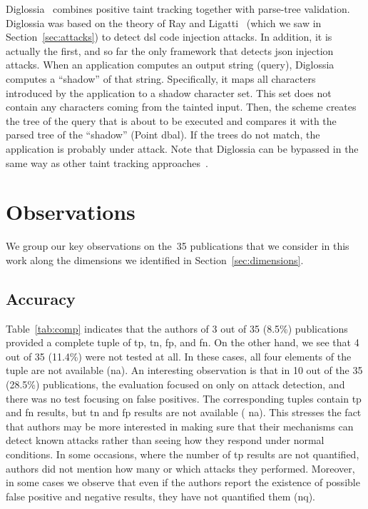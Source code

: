\documentclass[10pt,journal,compsoc]{IEEEtran}
\begin{document}
Diglossia~\cite{SMS13} combines positive taint tracking together
with parse-tree validation. Diglossia was based on the theory of Ray
and Ligatti~\cite{RL12b} (which we saw in Section~\ref{sec:attacks})
to detect {\sc dsl} code injection attacks. In addition, it is
actually the first, and so far the only framework that detects {\sc
  json} injection attacks. When an application computes an output
string (query), Diglossia computes a ``shadow'' of that string.
Specifically, it maps all characters introduced by the application to
a shadow character set. This set does not contain any characters
coming from the tainted input. Then, the scheme creates the tree of
the query that is about to be executed and compares it with the parsed
tree of the ``shadow'' (Point {\sc dbal}). If the trees do not match,
the application is probably under attack. Note that Diglossia
can be bypassed in the same way as other taint tracking
approaches~\cite{NBR14}.

\section{Observations}
\label{sec:discussion}

We group our key observations on the~35 publications that
we consider in this work along the
dimensions we identified in Section~\ref{sec:dimensions}.

\subsection{Accuracy}

Table~\ref{tab:comp} indicates that the authors of 3 out of 35 (8.5\%)
publications provided a complete tuple of {\sc tp}, {\sc tn}, 
{\sc fp}, and {\sc fn}. On the other hand, we
see that 4 out of 35 (11.4\%) were not tested at all.
In these cases, all four elements of the tuple
are not available ({\sc na}). An interesting observation is
that in 10 out of the 35 (28.5\%)
publications, the evaluation focused on only on attack detection,
and there was no test focusing on false positives.
The corresponding tuples contain {\sc tp} and {\sc fn}
results, but {\sc tn} and {\sc fp} results are not available ({\sc
  na}). This stresses the fact that authors may be more interested in
making sure that their mechanisms can detect known attacks rather than
seeing how they respond under normal conditions. In some occasions,
where the number of {\sc tp} results are not quantified, authors did
not mention how many or which attacks they performed. Moreover, in some
cases we observe that even if the authors report the existence of
possible false positive and negative results, they have not quantified
them ({\sc nq}).
\end{document}
